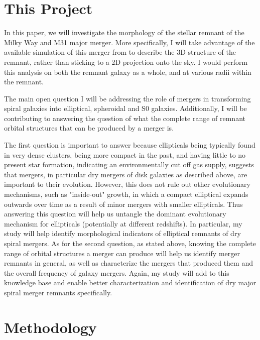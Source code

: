 \documentclass[twocolumn]{aastex631}
\begin{document}
\section{This Project}

In this paper, we will investigate the morphology of the stellar remnant of the Milky Way and M31 major merger.
More specifically, I will take advantage of the available simulation of this merger from \cite{van_der_Marel+2012} to describe the 3D structure of the remnant, rather than sticking to a 2D projection onto the sky.
I would perform this analysis on both the remnant galaxy as a whole, and at various radii within the remnant.

The main open question I will be addressing the role of mergers in transforming spiral galaxies into elliptical, spheroidal and S0 galaxies. 
Additionally, I will be contributing to answering the question of what the complete range of remnant orbital structures that can be produced by a merger is. 

The first question is important to answer because ellipticals being typically found in very dense clusters, being more compact in the past, and having little to no present star formation, indicating an environmentally cut off gas supply, suggests that mergers, in particular dry mergers of disk galaxies as described above, are important to their evolution. 
However, this does not rule out other evolutionary mechanisms, such as "inside-out" growth, in which a compact elliptical expands outwards over time as a result of minor mergers with smaller ellipticals.
Thus answering this question will help us untangle the dominant evolutionary mechanism for ellipticals (potentially at different redshifts).
In particular, my study will help identify morphological indicators of elliptical remnants of dry spiral mergers.
As for the second question, as stated above, knowing the complete range of orbital structures a merger can produce will help us identify merger remnants in general, as well as characterize the mergers that produced them and the overall frequency of galaxy mergers.
Again, my study will add to this knowledge base and enable better characterization and identification of dry major spiral merger remnants specifically.

\section{Methodology}
\end{document}
